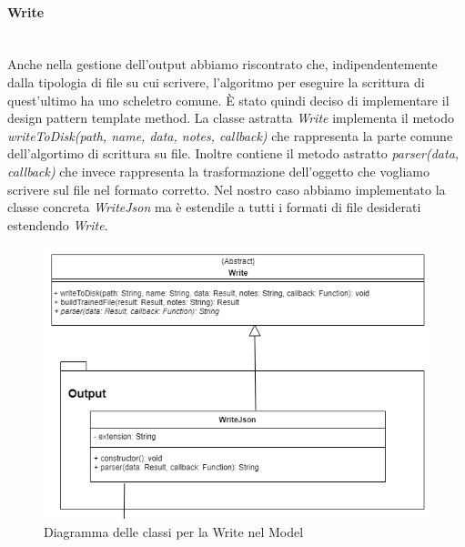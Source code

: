 		\paragraph*{Write} \mbox{} \\[1mm]
		Anche nella gestione dell'output abbiamo riscontrato che, indipendentemente dalla tipologia di file su cui scrivere, l'algoritmo per eseguire la scrittura di quest'ultimo ha uno scheletro comune. È stato quindi deciso di implementare il design pattern template method.
		La classe astratta \textit{Write} implementa il metodo \textit{writeToDisk(path, name, data, notes, callback)} che rappresenta la parte comune dell'algortimo di scrittura su file. Inoltre contiene il metodo astratto \textit{parser(data, callback)} che invece rappresenta la trasformazione dell'oggetto che vogliamo scrivere sul file nel formato corretto. Nel nostro caso abbiamo implementato la classe concreta \textit{WriteJson} ma è estendile a tutti i formati di file desiderati estendendo \textit{Write}.
		\mbox{}
				\begin{figure} [H]
					\begin{center}
						\includegraphics[width=120mm]{img/Diagrammi/write-app.png}
					\end{center}
					\caption{Diagramma delle classi per la Write nel Model}
				\end{figure}

